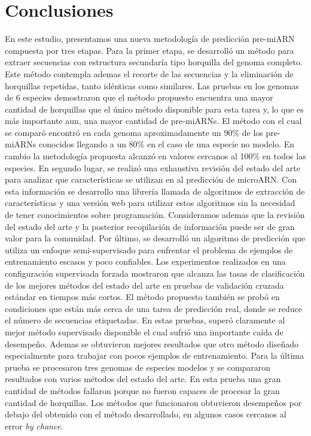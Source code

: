 \chapter{Conclusiones}
En este estudio, presentamos una nueva metodología de predicción pre-miARN compuesta por tres etapas. Para la primer etapa, se desarrolló un método para
extraer secuencias con estructura secundaría tipo horquilla del genoma completo. Este método contempla ademas el recorte de las secuencias y la eliminación
de horquillas repetidas, tanto idénticas como similares. Las pruebas en los genomas de 6 especies demostraron que el método propuesto encuentra una mayor
cantidad de horquillas que el único método disponible para esta tarea y, lo que es más importante aun, una mayor cantidad de pre-miARNs. El método con el
cual se comparó encontró en cada genoma aproximadamente un 90\% de los pre-miARNs conocidos llegando a un 80\% en el caso de una especie no modelo.
En cambio la metodología propuesta alcanzó en valores cercanos al 100\% en todos las especies.
En segundo lugar, se realizó una exhaustiva revisión del estado del arte para analizar que características se utilizan en al predicción de microARN. Con
esta información se desarrollo una librería llamada de algoritmos de extracción de características y una versión web para utilizar estos
algoritmos sin la necesidad de tener conocimientos sobre programación. Consideramos ademas que la revisión del estado del arte y la posterior recopilación
de información puede ser de gran valor para la comunidad.
Por último, se desarrolló un algoritmo de predicción que utiliza un enfoque semi-supervisado para enfrentar el problema de ejemplos de entrenamiento escasos
y poco confiables. Los experimentos realizados en una configuración supervisada forzada mostraron que alcanza las tasas de clasificación de los mejores métodos
del estado del arte en pruebas de validación cruzada estándar en tiempos más cortos. El método propuesto también se probó en condiciones que están más
cerca de una tarea de predicción real, donde se reduce el número de secuencias etiquetadas. En estas pruebas, superó claramente al mejor método supervisado
disponible el cual sufrió una importante caída de desempeño. Ademas se obtuvieron mejores resultados que otro método diseñado especialmente para trabajar con
pocos ejemplos de entrenamiento. Para la última prueba se procesaron tres genomas de especies modelos y se compararon resultados con varios métodos del estado
del arte. En esta prueba una gran cantidad de métodos fallaron porque no fueron capaces de procesar la gran cantidad de horquillas. Los métodos que funcionaron
obtuvieron desempeños por debajo del obtenido con el método desarrollado, en algunos casos cercanos al error \textit{by chance}.


